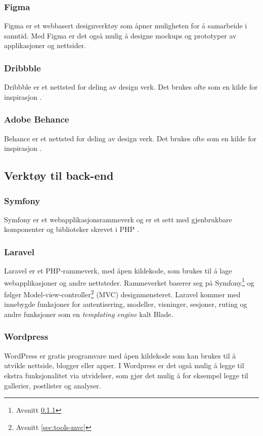 \subsubsection{Figma}
Figma \cite{figma2019abw} er et webbasert designverktøy som åpner muligheten for å samarbeide i sanntid. Med Figma er det også mulig å designe mockups og prototyper av applikasjoner og nettsider.

\subsubsection{Dribbble}
Dribbble er et nettsted for deling av design verk. Det brukes ofte som en kilde for inspirasjon \cite{Dribbble2019}.

\subsubsection{Adobe Behance}
Behance er et nettsted for deling av design verk. Det brukes ofte som en kilde for inspirasjon \cite{Sloan_wib}.

\subsection{Verktøy til back-end}

\subsubsection{Symfony}
\label{sec:tools-symfony}
Symfony er et webapplikasjonsrammeverk og er et sett med gjenbrukbare komponenter og biblioteker skrevet i PHP \cite{symfony19wis}. 

\subsubsection{Laravel}
Laravel \cite{cbcp2019lvw} er et PHP-rammeverk, med åpen kildekode, som brukes til å lage webapplikasjoner og andre nettsteder. Rammeverket baserer seg på Symfony\footnote{Avsnitt \ref{sec:tools-symfony}} og følger Model-view-controller\footnote{Avsnitt \ref{sec:tools-mvc}} (MVC) designmønsteret.
Laravel kommer med innebygde funksjoner for autentisering, modeller, visninger, sesjoner, ruting og andre funksjoner som en \textit{templating engine} kalt Blade.

\subsubsection{Wordpress}
WordPress\cite{wordpress} er gratis programvare med åpen kildekode som kan brukes til å utvikle nettside, blogger eller apper. I Wordpress er det også mulig å legge til ekstra funksjonalitet via utvidelser, som gjør det mulig å for eksempel legge til gallerier, postlister og analyser.

